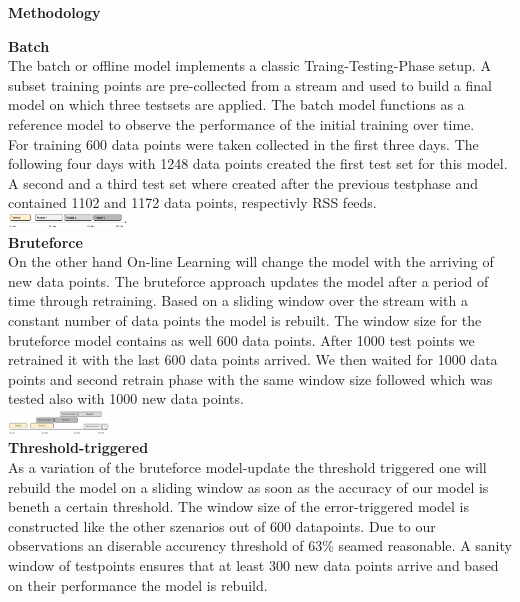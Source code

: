 \begin{center} \textbf{\huge Methodology} \end{center}
\textbf{\large Batch}\\
The batch or offline model implements a classic Traing-Testing-Phase setup. A subset training points are pre-collected from a stream and used to build a final model on  which three testsets are applied. The batch model functions as a reference model to observe the performance of the initial training over time. \\
For training 600 data points were taken collected in the first three days. The following four days with 1248 data points created the first test set for this model. A second and a third test set where created after the previous testphase and contained 1102 and 1172 data points, respectivly RSS feeds.\\

      \includegraphics[width=0.24\textwidth]{./time_models/OfflineModel.png}\\
\textbf{\large Bruteforce}\\
On the other hand On-line Learning will change the model with the arriving of new data points.
The bruteforce approach updates the model after a period of time through retraining. Based on a sliding window over the stream with a constant number of data points 
the model is rebuilt. The window size for the bruteforce model contains as well 600 data points. After 1000 test points we retrained it with the last 600 data points arrived. We then waited for 1000 data points and second retrain phase with the same window size followed which was tested also with 1000 new data points.\\

   \includegraphics[width=0.2\textwidth]{./time_models/BruteforceModel}\\
\textbf{\large Threshold-triggered}\\
As a variation of the bruteforce model-update the threshold triggered one will rebuild the model on a sliding window as soon as the accuracy of our model is beneth a certain threshold. The window size of the error-triggered model is constructed like the other szenarios out of 600 datapoints. Due to our observations an diserable accurency threshold of 63\% seamed reasonable. A sanity window of testpoints ensures that at least 300 new data points arrive and based on their performance the model is rebuild.\\
\\
\\

